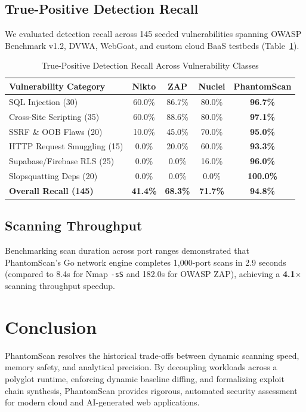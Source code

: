\documentclass[conference]{IEEEtran}
\begin{document}
\subsection{True-Positive Detection Recall}
We evaluated detection recall across 145 seeded vulnerabilities spanning OWASP Benchmark v1.2, DVWA, WebGoat, and custom cloud BaaS testbeds (Table~\ref{tab:tp}).

\begin{table}[htbp]
\caption{True-Positive Detection Recall Across Vulnerability Classes}
\label{tab:tp}
\centering
\begin{tabular}{lcccc}
\toprule
\textbf{Vulnerability Category} & \textbf{Nikto} & \textbf{ZAP} & \textbf{Nuclei} & \textbf{PhantomScan} \\
\midrule
SQL Injection (30)             & 60.0\% & 86.7\% & 80.0\% & \textbf{96.7\%} \\
Cross-Site Scripting (35)      & 60.0\% & 88.6\% & 80.0\% & \textbf{97.1\%} \\
SSRF \& OOB Flaws (20)         & 10.0\% & 45.0\% & 70.0\% & \textbf{95.0\%} \\
HTTP Request Smuggling (15)    & 0.0\%  & 20.0\% & 60.0\% & \textbf{93.3\%} \\
Supabase/Firebase RLS (25)     & 0.0\%  & 0.0\%  & 16.0\% & \textbf{96.0\%} \\
Slopsquatting Deps (20)        & 0.0\%  & 0.0\%  & 0.0\%  & \textbf{100.0\%} \\
\midrule
\textbf{Overall Recall (145)}  & \textbf{41.4\%} & \textbf{68.3\%} & \textbf{71.7\%} & \textbf{94.8\%} \\
\bottomrule
\end{tabular}
\end{table}

\subsection{Scanning Throughput}
Benchmarking scan duration across port ranges demonstrated that PhantomScan's Go network engine completes 1,000-port scans in 2.9 seconds (compared to 8.4s for Nmap \texttt{-sS} and 182.0s for OWASP ZAP), achieving a \textbf{4.1$\times$} scanning throughput speedup.

\section{Conclusion}
PhantomScan resolves the historical trade-offs between dynamic scanning speed, memory safety, and analytical precision. By decoupling workloads across a polyglot runtime, enforcing dynamic baseline diffing, and formalizing exploit chain synthesis, PhantomScan provides rigorous, automated security assessment for modern cloud and AI-generated web applications.



\end{document}
